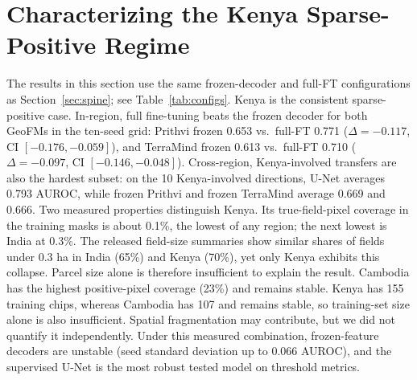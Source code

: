\documentclass{article}
\begin{document}
\section{Characterizing the Kenya Sparse-Positive Regime}
\label{sec:boundary}
The results in this section use the same frozen-decoder and full-FT configurations as Section~\ref{sec:spine}; see Table~\ref{tab:configs}.
Kenya is the consistent sparse-positive case. In-region, full fine-tuning beats the
frozen decoder for both GeoFMs in the ten-seed grid: Prithvi frozen 0.653 vs.\ full-FT
0.771 ($\Delta=-0.117$, CI $[-0.176,-0.059]$), and TerraMind frozen 0.613 vs.\
full-FT 0.710 ($\Delta=-0.097$, CI $[-0.146,-0.048]$). Cross-region,
Kenya-involved transfers are also the hardest subset: on the 10 Kenya-involved
directions, U-Net averages 0.793 AUROC, while frozen Prithvi and frozen TerraMind
average 0.669 and 0.666.
Two measured properties distinguish Kenya. Its true-field-pixel coverage in the training
masks is about 0.1\%, the lowest of any region; the next lowest is India at 0.3\%.
The released field-size summaries show similar shares of fields under 0.3 ha in
India (65\%) and Kenya (70\%), yet only Kenya exhibits this collapse. Parcel size alone
is therefore insufficient to explain the result. Cambodia has the highest
positive-pixel coverage (23\%) and remains stable. Kenya has 155 training chips, whereas
Cambodia has 107 and remains stable, so training-set size alone is also insufficient.
Spatial fragmentation may contribute, but we did not quantify it independently.
Under this measured combination, frozen-feature decoders are unstable (seed standard
deviation up to $0.066$ AUROC), and the supervised U-Net is the most robust tested model on
threshold metrics.
\end{document}
